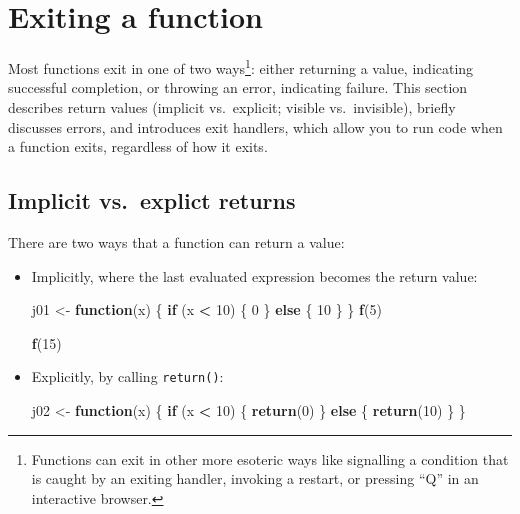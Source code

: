 \documentclass[]{book}
\newenvironment{Shaded}{\begin{snugshade}}{\end{snugshade}}
\newcommand{\ControlFlowTok}[1]{\textcolor[rgb]{0.13,0.29,0.53}{\textbf{#1}}}
\newcommand{\DecValTok}[1]{\textcolor[rgb]{0.00,0.00,0.81}{#1}}
\newcommand{\KeywordTok}[1]{\textcolor[rgb]{0.13,0.29,0.53}{\textbf{#1}}}
\newcommand{\NormalTok}[1]{#1}
\newcommand{\OperatorTok}[1]{\textcolor[rgb]{0.81,0.36,0.00}{\textbf{#1}}}
\newcommand{\StringTok}[1]{\textcolor[rgb]{0.31,0.60,0.02}{#1}}
\let\rmarkdownfootnote\footnote%
\def\footnote{\protect\rmarkdownfootnote}
\theoremstyle{definition}
\theoremstyle{definition}
\theoremstyle{definition}
\theoremstyle{remark}
\begin{document}
\hypertarget{exiting-a-function}{%
\section{Exiting a function}\label{exiting-a-function}}

Most functions exit in one of two ways\footnote{Functions can exit in
  other more esoteric ways like signalling a condition that is caught by
  an exiting handler, invoking a restart, or pressing ``Q'' in an
  interactive browser.}: either returning a value, indicating successful
completion, or throwing an error, indicating failure. This section
describes return values (implicit vs.~explicit; visible vs.~invisible),
briefly discusses errors, and introduces exit handlers, which allow you
to run code when a function exits, regardless of how it exits.

\hypertarget{implicit-vs.explict-returns}{%
\subsection{Implicit vs.~explict
returns}\label{implicit-vs.explict-returns}}

There are two ways that a function can return a value:

\begin{itemize}
\item
  Implicitly, where the last evaluated expression becomes the return
  value:

\begin{Shaded}
\begin{Highlighting}[]
\NormalTok{j01 <-}\StringTok{ }\ControlFlowTok{function}\NormalTok{(x) \{}
  \ControlFlowTok{if}\NormalTok{ (x }\OperatorTok{<}\StringTok{ }\DecValTok{10}\NormalTok{) \{}
    \DecValTok{0}
\NormalTok{  \} }\ControlFlowTok{else}\NormalTok{ \{}
    \DecValTok{10}
\NormalTok{  \}}
\NormalTok{\}}
\KeywordTok{f}\NormalTok{(}\DecValTok{5}\NormalTok{)}
\end{Highlighting}
\end{Shaded}

\begin{Shaded}
\begin{Highlighting}[]
\KeywordTok{f}\NormalTok{(}\DecValTok{15}\NormalTok{)}
\end{Highlighting}
\end{Shaded}
\item
  Explicitly, by calling \texttt{return()}:

\begin{Shaded}
\begin{Highlighting}[]
\NormalTok{j02 <-}\StringTok{ }\ControlFlowTok{function}\NormalTok{(x) \{}
  \ControlFlowTok{if}\NormalTok{ (x }\OperatorTok{<}\StringTok{ }\DecValTok{10}\NormalTok{) \{}
    \KeywordTok{return}\NormalTok{(}\DecValTok{0}\NormalTok{)}
\NormalTok{  \} }\ControlFlowTok{else}\NormalTok{ \{}
    \KeywordTok{return}\NormalTok{(}\DecValTok{10}\NormalTok{)}
\NormalTok{  \}}
\NormalTok{\}}
\end{Highlighting}
\end{Shaded}
\end{itemize}
\end{document}
